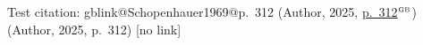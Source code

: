 \documentclass{article}
\makeatletter
\newcommand{\getgblink}[2]{\csname gblink@#1@#2\endcsname}
\newcommand{\ifgblink}[2]{%
  \ifcsname gblink@#1@#2\endcsname
    \expandafter\@firstoftwo
  \else
    \expandafter\@secondoftwo
  \fi
}
\newcommand{\testcite}[2]{%
  \ifgblink{#1}{#2}{%
    (Author, 2025, {\color{gbcolor}\href{\getgblink{#1}{#2}}{#2$^{\text{\tiny GB}}$}})%
  }{%
    (Author, 2025, #2) [no link]%
  }%
}
\makeatother
\begin{document}
Test citation: \testcite{Schopenhauer1969}{p.~312}
\end{document}
